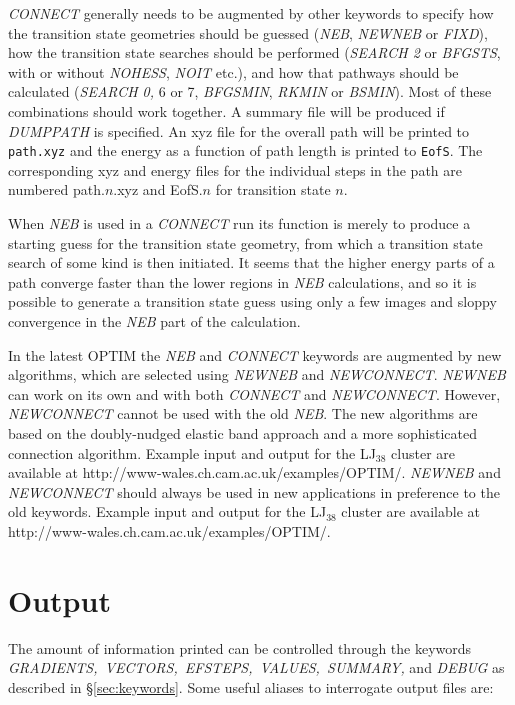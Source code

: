 \documentclass[12pt,a4paper,dvips]{article}
\begin{document}
{\it CONNECT\/} generally needs to be augmented by other keywords to specify how the transition
state geometries should be guessed ({\it NEB\/},
{\it NEWNEB\/} or {\it FIXD\/}), how the transition
state searches should be performed ({\it SEARCH 2\/} or {\it BFGSTS\/}, with or
without {\it NOHESS\/}, {\it NOIT\/} etc.), and how that pathways should be
calculated ({\it SEARCH 0,\/} 6 or 7, {\it BFGSMIN\/}, {\it RKMIN} or {\it BSMIN\/}).
Most of these combinations should work together.
A summary file will be produced if {\it DUMPPATH\/} is specified. An xyz file
for the overall path will be printed to {\tt path.xyz} and the energy as a
function of path length is printed to {\tt EofS}. The corresponding xyz and energy
files for the individual steps in the path are numbered path.$n$.xyz and EofS.$n$ for
transition state $n$.

When {\it NEB\/} is used in a {\it CONNECT\/} run its function is merely to produce a
starting guess for the transition state geometry, from which a transition state search
of some kind is then initiated. It seems that the higher energy parts of a path converge 
faster than the lower regions in {\it NEB\/} calculations, and so it is possible to generate
a transition state guess using only a few images and sloppy convergence in the {\it NEB\/}
part of the calculation.

In the latest OPTIM the {\it NEB\/} and {\it CONNECT\/} keywords are augmented by new algorithms,
which are selected using {\it NEWNEB\/} and {\it NEWCONNECT\/}. {\it NEWNEB\/} can work on its
own and with both {\it CONNECT\/} and {\it NEWCONNECT\/}. However, {\it NEWCONNECT\/}
cannot be used with the old {\it NEB\/}.
The new algorithms are based on the doubly-nudged elastic band approach and a 
more sophisticated connection algorithm.\cite{TrygubenkoW04}
Example input and output for the LJ$_{38}$ cluster are available at
http://www-wales.ch.cam.ac.uk/examples/OPTIM/.
{\it NEWNEB\/} and {\it NEWCONNECT\/} should always be used in new applications
in preference to the old keywords.
Example input and output for the LJ$_{38}$ cluster are available at
http://www-wales.ch.cam.ac.uk/examples/OPTIM/.

\section{Output}
\label{sec:output}
The amount of information printed can be controlled
through the keywords {\it GRADIENTS,\ VECTORS,\ EFSTEPS,\ VALUES,\ SUMMARY,\/}
and {\it DEBUG\/} as described in \S\ref{sec:keywords}.
Some useful aliases to interrogate output files are:
\end{document}
